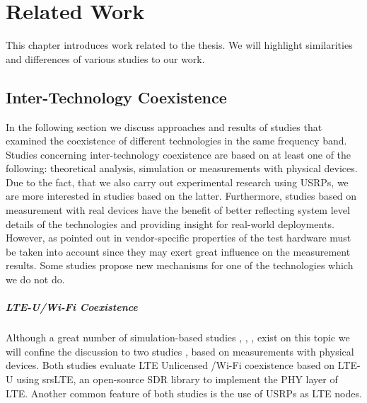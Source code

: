 \chapter{Related Work}
\label{ch:related-work}

This chapter introduces work related to the thesis. We will highlight similarities and differences of various studies to our work. 

\section{Inter-Technology Coexistence}

In the following section we discuss approaches and results of studies that examined the coexistence of different technologies in the same frequency band. Studies concerning inter-technology coexistence are based on at least one of the following: theoretical analysis, simulation or measurements with physical devices. Due to the fact, that we also carry out experimental research using USRPs, we are more interested in studies based on the latter. Furthermore, studies based on measurement with real devices have the benefit of better reflecting system level details of the technologies and providing insight for real-world deployments. However, as pointed out in \cite{gomezmiguelez16} vendor-specific properties of the test hardware must be taken into account since they may exert great influence on the measurement results. Some studies propose new mechanisms for one of the technologies which we do not do.

\paragraph{LTE-U/Wi-Fi Coexistence}
Although a great number of simulation-based studies \cite{nihtilä13}, \cite{rupasinghe14}, \cite{jeon14}, \cite{cavalcante13} exist on this topic we will confine the discussion to two studies \cite{gomezmiguelez16}, \cite{capretti16} based on measurements with physical devices. Both studies evaluate LTE Unlicensed /Wi-Fi coexistence based on LTE-U using srsLTE, an open-source SDR library to implement the PHY layer of LTE. Another common feature of both studies is the use of USRPs as LTE nodes. 

